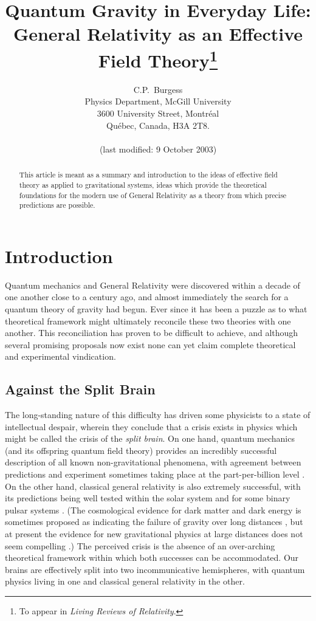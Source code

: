 \documentclass[11pt]{article}
\title{Quantum Gravity in Everyday Life:\\
General Relativity as an Effective Field Theory\footnote{To appear
in {\it Living Reviews of Relativity}.}}
\author{C.P.\ Burgess \\
        Physics Department, McGill University \\
        3600 University Street, Montr{\'e}al \\
        Qu{\'e}bec, Canada, H3A 2T8. \\
\\
\small{(last modified: 9 October 2003)} }
\date{}
\begin{document}
\maketitle

\begin{abstract}
This article is meant as a summary and introduction to
the ideas of effective field theory as applied to gravitational
systems, ideas which provide the theoretical foundations for the
modern use of General Relativity as a theory from which precise
predictions are possible.
\end{abstract}



\section{Introduction}
\label{section:introduction}
%
Quantum mechanics and General Relativity were discovered within a
decade of one another close to a century ago, and almost
immediately the search for a quantum theory of gravity had begun.
Ever since it has been a puzzle as to what theoretical framework
might ultimately reconcile these two theories with one another.
This reconciliation has proven to be difficult to achieve, and
although several promising proposals now exist none can yet claim
complete theoretical and experimental vindication.

\subsection{Against the Split Brain}
%
The long-standing nature of this difficulty has driven some
physicists to a state of intellectual despair, wherein they
conclude that a crisis exists in physics which might be called the
crisis of the \emph{split brain}. On one hand, quantum mechanics
(and its offspring quantum field theory) provides an incredibly
successful description of all known non-gravitational phenomena,
with agreement between predictions and experiment sometimes taking
place at the part-per-billion level \cite{QED,EWdata}. On the
other hand, classical general relativity is also extremely
successful, with its predictions being well tested within the
solar system and for some binary pulsar systems \cite{GRdata}.
(The cosmological evidence for dark matter and dark energy is
sometimes proposed as indicating the failure of gravity over long
distances \cite{MOND}, but at present the evidence for new
gravitational physics at large distances does not seem compelling
\cite{DMvsNP}.) The perceived crisis is the absence of an
over-arching theoretical framework within which both successes can
be accommodated. Our brains are effectively split into two
incommunicative hemispheres, with quantum physics living in one
and classical general relativity in the other.
\end{document}

